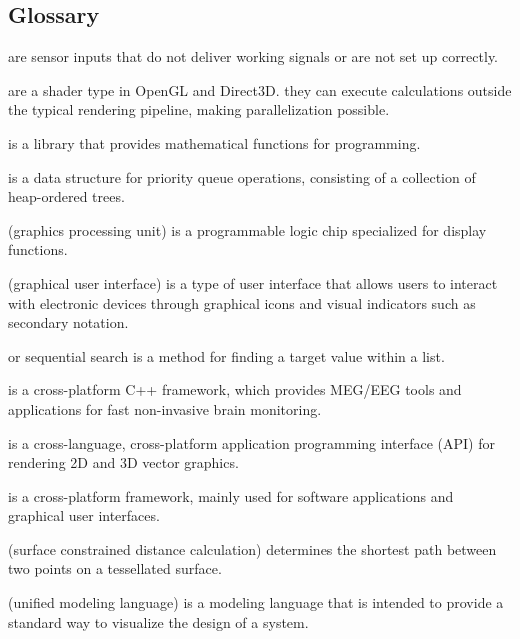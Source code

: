 \subsection {Glossary}

\item [Bad channels] are sensor inputs that do not deliver working signals or are not set up correctly.
\item [Compute shaders] are a shader type in OpenGL and Direct3D. they can execute calculations outside the typical rendering pipeline, making parallelization possible.
\item [Disp3D]
\item [Eigen] is a library that provides mathematical functions for programming.
\item [Fibonacci Heap] is a data structure for priority queue operations, consisting of a collection of heap-ordered trees.
\item [GPU] (graphics processing unit) is a programmable logic chip specialized for display functions.
\item [GUI] (graphical user interface) is a type of user interface that allows users to interact with electronic devices through graphical icons and visual indicators such as secondary notation.
\item [Linear search] or sequential search is a method for finding a target value within a list.
\item [MNE-CPP] is a cross-platform C++ framework, which provides MEG/EEG tools and applications for fast non-invasive brain monitoring.
\item [OpenGL] is a cross-language, cross-platform application programming interface (API) for rendering 2D and 3D vector graphics.
\item [Qt] is a cross-platform framework, mainly used for software applications and graphical user interfaces.
\item [SCDC] (surface constrained distance calculation) determines the shortest path between two points on a tessellated surface.
\item [UML] (unified modeling language)  is a modeling language that is intended to provide a standard way to visualize the design of a system. 
